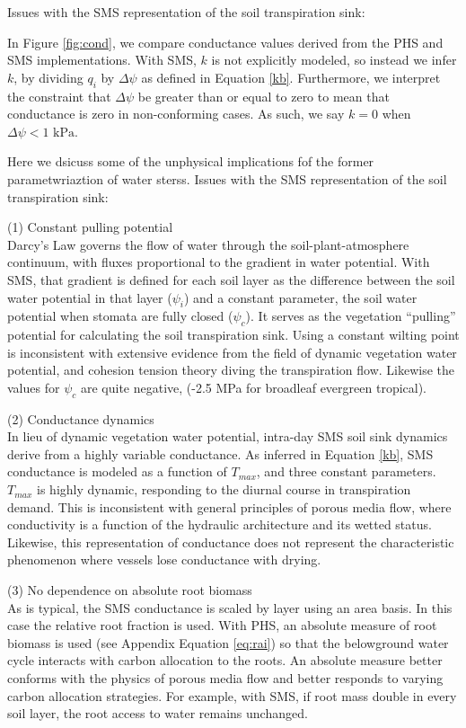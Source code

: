 \documentclass[draft,linenumbers]{agujournal}
\begin{document}
    Issues with the SMS representation of the soil transpiration sink: 

    In Figure \ref{fig:cond}, we compare conductance values derived from the PHS and SMS implementations.
    With SMS, $k$ is not explicitly modeled, so instead we infer $k$, 
    by dividing $q_i$ by $\Delta\psi$ as defined in Equation \ref{kb}.
    Furthermore, we interpret the constraint that $\Delta\psi$ be greater than or equal to zero to mean 
    that conductance is zero in non-conforming cases. As such, we say $k=0$ when $\Delta\psi<\text{1 kPa}$.
    
    Here we dsicuss some of the unphysical implications fof the former parametwriaztion of water sterss. Issues with the SMS representation of the soil transpiration sink: 
    
    (1) Constant pulling potential \\
    Darcy's Law governs the flow of water through the soil-plant-atmosphere continuum, 
    with fluxes proportional to the gradient in water potential. 
    With SMS, that gradient is defined for each soil layer as 
    the difference between the soil water potential in that layer ($\psi_i$) 
    and a constant parameter, the soil water potential when stomata are fully closed ($\psi_{c}$).
    It serves as the vegetation ``pulling'' potential for calculating the soil transpiration sink.
    Using a constant wilting point is inconsistent with extensive evidence from the field of dynamic vegetation water potential, and cohesion tension theory diving the transpiration flow.
    Likewise the values for $\psi_{c}$ are quite negative, (-2.5 MPa for broadleaf evergreen tropical). 
    
    (2) Conductance dynamics \\
    In lieu of dynamic vegetation water potential, intra-day SMS soil sink dynamics derive from a highly variable conductance.
    As inferred in Equation \ref{kb}, SMS conductance is modeled as a function of $T_{max}$, and three constant parameters.
    $T_{max}$ is highly dynamic, responding to the diurnal course in transpiration demand.
    This is inconsistent with general principles of porous media flow, where conductivity is a function of the hydraulic architecture and its wetted status.
    Likewise, this representation of conductance does not represent the characteristic phenomenon where vessels lose conductance with drying.
      
    (3) No dependence on absolute root biomass \\
    As is typical, the SMS conductance is scaled by layer using an area basis.
    In this case the relative root fraction is used.
    With PHS, an absolute measure of root biomass is used (see Appendix Equation \ref{eq:rai}) so that the belowground water cycle interacts with carbon allocation to the roots.
    An absolute measure better conforms with the physics of porous media flow and better responds to varying carbon allocation strategies.
    For example, with SMS, if root mass double in every soil layer, the root access to water remains unchanged.
\end{document}
